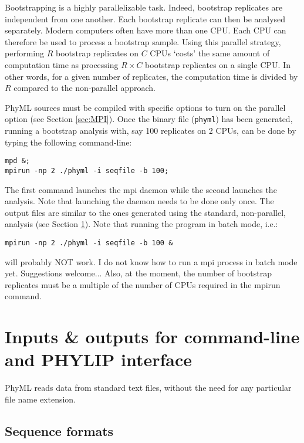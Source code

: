 \documentclass[a4paper,12pt]{article}
\newcommand{\x}[1]{\texttt{#1}}
\begin{document}
Bootstrapping is  a highly  parallelizable task. Indeed,  bootstrap replicates are  independent from
one another.   Each bootstrap replicate can then  be analysed separately. Modern  computers often have
more than one CPU. Each CPU can therefore be used to process a bootstrap sample. Using this parallel
strategy, performing  $R$ bootstrap replicates  on $C$ CPUs  `costs' the same amount  of computation
time as processing $R  \times C$ bootstrap replicates on a single CPU.  In  other words, for a given
number of replicates, the computation time is divided by $R$ compared to the non-parallel approach.

PhyML sources  must be compiled with  specific options to turn  on the parallel  option (see Section
\ref{sec:MPI}). Once  the binary file (\x{phyml})  has been generated, running  a bootstrap analysis
with, say 100 replicates on 2 CPUs, can be done by typing the following command-line:
\begin{verbatim}
mpd &;
mpirun -np 2 ./phyml -i seqfile -b 100;
\end{verbatim} 
The  first command  launches  the mpi  daemon  while the  second launches  the  analysis. Note  that
launching the daemon needs to be done only once.  The output files are similar to the ones generated
using the standard, non-parallel, analysis (see Section \ref{sec:input_output}). Note that running 
the program in batch mode, i.e.:
\begin{verbatim}
mpirun -np 2 ./phyml -i seqfile -b 100 &
\end{verbatim} 
will probably NOT work. I do not know how to run a mpi process in batch mode yet. Suggestions welcome...
Also, at the moment, the number of bootstrap replicates must be a multiple of the number of CPUs
required in the mpirun command.

\section{Inputs \& outputs for command-line and PHYLIP interface }\label{sec:input_output}

PhyML reads data from standard text files,  without the need for any particular file name extension.

\subsection{Sequence formats}
\end{document}
